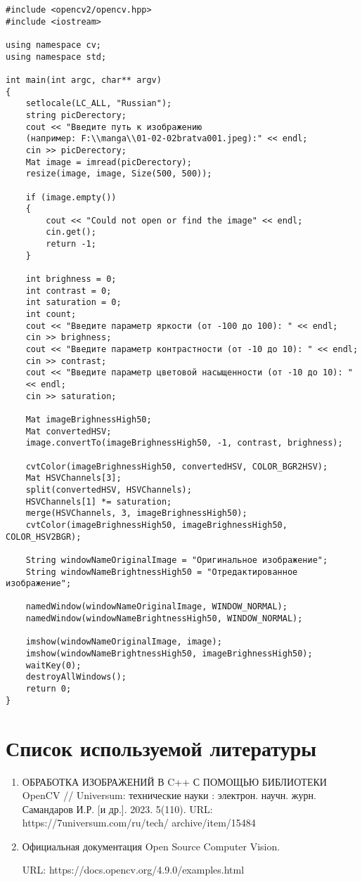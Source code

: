\documentclass[14pt,a4paper]{scrartcl}
\begin{document}
\begin{verbatim}
#include <opencv2/opencv.hpp>
#include <iostream>

using namespace cv;
using namespace std;

int main(int argc, char** argv)
{
    setlocale(LC_ALL, "Russian");
    string picDerectory;
    cout << "Введите путь к изображению 
    (например: F:\\manga\\01-02-02bratva001.jpeg):" << endl;
    cin >> picDerectory;
    Mat image = imread(picDerectory);
    resize(image, image, Size(500, 500));
    
    if (image.empty())
    {
        cout << "Could not open or find the image" << endl;
        cin.get();
        return -1;
    }

    int brighness = 0;
    int contrast = 0;
    int saturation = 0;
    int count;
    cout << "Введите параметр яркости (от -100 до 100): " << endl;
    cin >> brighness;
    cout << "Введите параметр контрастности (от -10 до 10): " << endl;
    cin >> contrast;
    cout << "Введите параметр цветовой насыщенности (от -10 до 10): " 
    << endl;
    cin >> saturation;

    Mat imageBrighnessHigh50;
    Mat convertedHSV;
    image.convertTo(imageBrighnessHigh50, -1, contrast, brighness); 
        
    cvtColor(imageBrighnessHigh50, convertedHSV, COLOR_BGR2HSV);
    Mat HSVChannels[3];
    split(convertedHSV, HSVChannels);
    HSVChannels[1] *= saturation;
    merge(HSVChannels, 3, imageBrighnessHigh50);
    cvtColor(imageBrighnessHigh50, imageBrighnessHigh50, COLOR_HSV2BGR);

    String windowNameOriginalImage = "Оригинальное изображение";
    String windowNameBrightnessHigh50 = "Отредактированное изображение";

    namedWindow(windowNameOriginalImage, WINDOW_NORMAL);
    namedWindow(windowNameBrightnessHigh50, WINDOW_NORMAL);

    imshow(windowNameOriginalImage, image);
    imshow(windowNameBrightnessHigh50, imageBrighnessHigh50);
    waitKey(0); 
    destroyAllWindows();
    return 0;
}
\end{verbatim}

\newpage
\section{Список используемой литературы}

\begin{enumerate}

\item ОБРАБОТКА ИЗОБРАЖЕНИЙ В C++ С ПОМОЩЬЮ БИБЛИОТЕКИ OpenCV //
Universum: технические науки : электрон. научн. журн. Самандаров И.Р. [и др.]. 2023. 5(110). 
URL: https://7universum.com/ru/tech/
archive/item/15484
\item Официальная документация Open Source Computer Vision. 

URL: https://docs.opencv.org/4.9.0/examples.html
\end{enumerate}
\end{document}
